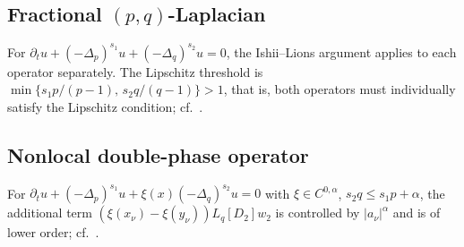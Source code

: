 \documentclass[11pt, a4paper, twoside]{article}
\theoremstyle{definition}
\theoremstyle{remark}
\begin{document}
\subsection*{Fractional $(p,q)$-Laplacian}
For $\partial_t u + (-\Delta_p)^{s_1}u
+ (-\Delta_q)^{s_2}u = 0$, the Ishii--Lions argument
applies to each operator separately. The Lipschitz
threshold is $\min\{s_1p/(p-1),\, s_2q/(q-1)\} > 1$,
that is, both operators must individually satisfy the
Lipschitz condition; cf.~\cite[Theorem~5.1]{BiswasTopp2025}.

\subsection*{Nonlocal double-phase operator}
For $\partial_t u + (-\Delta_p)^{s_1}u
+ \xi(x)(-\Delta_q)^{s_2}u = 0$ with
$\xi \in C^{0,\alpha}$, $s_2q \le s_1p+\alpha$, the
additional term $(\xi(x_\nu)-\xi(y_\nu))
L_q[D_2]w_2$ is controlled by $|a_\nu|^\alpha$ and is of
lower order; cf.~\cite[Theorem~5.2]{BiswasTopp2025}.


\end{document}
